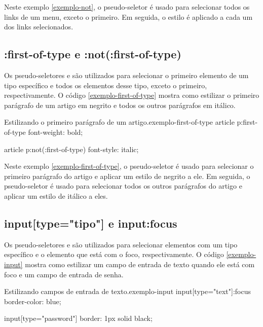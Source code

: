Neste exemplo \ref{exemplo-not}, o pseudo-seletor  é usado para selecionar todos os links de um menu, exceto o primeiro. Em seguida, o estilo é aplicado a cada um dos links selecionados.

\subsection{:first-of-type e :not(:first-of-type)}

Os pseudo-seletores  e  são utilizados para selecionar o primeiro elemento de um tipo específico e todos os elementos desse tipo, exceto o primeiro, respectivamente. O código \ref{exemplo-first-of-type} mostra como estilizar o primeiro parágrafo de um artigo em negrito e todos os outros parágrafos em itálico.

\begin{csscode}{Estilizando o primeiro parágrafo de um artigo.}{exemplo-first-of-type}
article p:first-of-type {
    font-weight: bold;
}

article p:not(:first-of-type) {
    font-style: italic;
}
\end{csscode}

Neste exemplo \ref{exemplo-first-of-type}, o pseudo-seletor  é usado para selecionar o primeiro parágrafo do artigo e aplicar um estilo de negrito a ele. Em seguida, o pseudo-seletor  é usado para selecionar todos os outros parágrafos do artigo e aplicar um estilo de itálico a eles.

\subsection{input[type="tipo"] e input:focus}

Os pseudo-seletores  e  são utilizados para selecionar elementos  com um tipo específico e o elemento  que está com o foco, respectivamente. O código \ref{exemplo-input} mostra como estilizar um campo de entrada de texto quando ele está com foco e um campo de entrada de senha.

\begin{csscode}{Estilizando campos de entrada de texto.}{exemplo-input}
input[type="text"]:focus {
    border-color: blue;
}

input[type="password"] {
    border: 1px solid black;
}
\end{csscode}

